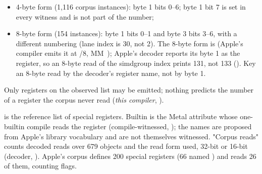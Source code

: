 \begin{itemize}
\item 4-byte form (1,116 corpus instances): byte 1 bits 0–6; byte 1 bit 7 is set in every witness and is not part of the
  number;
\item 8-byte form (154 instances): byte 1 bits 0–1 and byte 3 bits 3–6, with a different numbering (lane index is 30, not 2).
  The 8-byte form is  (Apple's compiler emits it at /8, MM~); Apple's decoder
  reports its byte 1 as the register, so an 8-byte read of the simdgroup index prints 131, not 133 ().
  Key an 8-byte read by the decoder's register name, not by byte 1.
\end{itemize}

Only registers on the observed list may be emitted; nothing predicts the number of a register the corpus never read
(\emph{this compiler}, ).

 is the reference list of special registers. Builtin is the Metal attribute whose one-builtin compile reads the register (compile-witnessed,
); the  names are proposed from Apple's library vocabulary and are not themselves
witnessed. "Corpus reads" counts decoded reads over 679 objects and the read form used, 32-bit or 16-bit (decoder,
). Apple's corpus defines 200 special registers (66 named ) and reads 26 of them,
counting flags.

